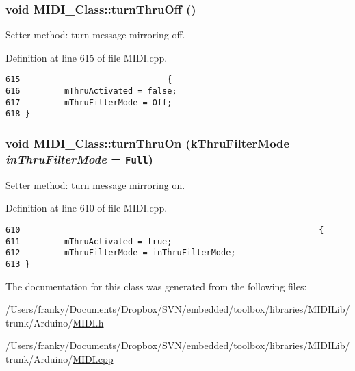 \hypertarget{class_m_i_d_i___class_c1999ba222737523008d6f1c579d6816}{
\subsubsection[{turnThruOff}]{\setlength{\rightskip}{0pt plus 5cm}void MIDI\_\-Class::turnThruOff ()}}
\label{class_m_i_d_i___class_c1999ba222737523008d6f1c579d6816}


Setter method: turn message mirroring off. 

Definition at line 615 of file MIDI.cpp.

\begin{Code}\begin{verbatim}615                              {
616         mThruActivated = false; 
617         mThruFilterMode = Off;
618 }
\end{verbatim}
\end{Code}


\hypertarget{class_m_i_d_i___class_7fd1759eda22c18f6122b4231e1f0a6d}{
\subsubsection[{turnThruOn}]{\setlength{\rightskip}{0pt plus 5cm}void MIDI\_\-Class::turnThruOn ({\bf kThruFilterMode} {\em inThruFilterMode} = {\tt Full})}}
\label{class_m_i_d_i___class_7fd1759eda22c18f6122b4231e1f0a6d}


Setter method: turn message mirroring on. 

Definition at line 610 of file MIDI.cpp.

\begin{Code}\begin{verbatim}610                                                             { 
611         mThruActivated = true;
612         mThruFilterMode = inThruFilterMode;
613 }
\end{verbatim}
\end{Code}




The documentation for this class was generated from the following files:\begin{CompactItemize}
\item 
/Users/franky/Documents/Dropbox/SVN/embedded/toolbox/libraries/MIDILib/trunk/Arduino/\hyperlink{_m_i_d_i_8h}{MIDI.h}\item 
/Users/franky/Documents/Dropbox/SVN/embedded/toolbox/libraries/MIDILib/trunk/Arduino/\hyperlink{_m_i_d_i_8cpp}{MIDI.cpp}\end{CompactItemize}
